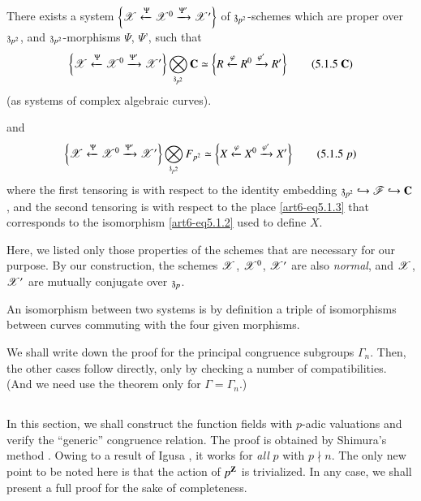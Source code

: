 \begin{theorem*}
There exists a system $\left\{\mathscr{X} \xleftarrow{\Psi}\mathscr{X}^0 \xrightarrow{\Psi'} \mathscr{X}' \right\}$ of $\mathfrak{z}_{p^2}$-schemes which are proper over $\mathfrak{z}_{p^2}$, and $\mathfrak{z}_{p^2}$-morphisms $\Psi$, $\Psi$', such that 
\begin{equation*}
\left\{\sX \xleftarrow{\Psi}\sX^0 \xrightarrow{\Psi'}  \sX' \right\} \bigotimes_{\fz_{p^2}} \bC \simeq \left\{R \xleftarrow{\varphi} R^0 \xrightarrow{\varphi'}  R' \right\}
\tag{5.1.5 $\bC$}\label{art6-eq5.1.5C}
\end{equation*}
(as systems of complex algebraic curves).

\noindent
and\pageoriginale 
\begin{equation*}
\left\{\mathscr{X} \xleftarrow{\Psi}\mathscr{X}^0 \xrightarrow{\Psi'}  \mathscr{X}' \right\} \bigotimes_{\mathfrak{z}_{p^2}} F_{p^2} \simeq \left\{X \xleftarrow{\varphi} X^0 \xrightarrow{\varphi'}  X' \right\}
\tag{5.1.5 $p$}\label{art6-eq5.1.5p}
\end{equation*}
where the first tensoring is with respect to the identity embedding $\mathfrak{z}_{p^2} \hookrightarrow \mathscr{F} \hookrightarrow \mathbf{C}$, and the second tensoring is with respect to the place \eqref{art6-eq5.1.3} that corresponds to the isomorphism \eqref{art6-eq5.1.2} used to define $X$.
\end{theorem*}

Here, we listed only those properties of the schemes that are necessary for our purpose. By our construction, the schemes $\mathscr{X}$, $\mathscr{X}^0$, $\mathscr{X}'$ are also \textit{normal}, and $\mathscr{X}$, $\mathscr{X}'$ are mutually conjugate over $\mathfrak{z}_p$.

An isomorphism between two systems is by definition a triple of isomorphisms between curves commuting with the four given morphisms.

We shall write down the proof for the principal congruence subgroups $\Gamma_n$. Then, the other cases follow directly, only by checking a number of compatibilities. (And we need use the theorem only for $\Gamma = \Gamma_n$.)

\subsection{}\label{art6-subsec5.2}
In this section, we shall construct the function fields with $p$-adic valuations and verify the ``generic'' congruence relation. The proof is obtained by Shimura's method \cite{art6-key17}. Owing to a result of Igusa \cite{art6-key6}, it works for \textit{all} $p$ with $p \nmid n$. The only new point to be noted here is that the action of $p^{\mathbf{Z}}$ is trivialized. In any case, we shall present a full proof for the sake of completeness.

